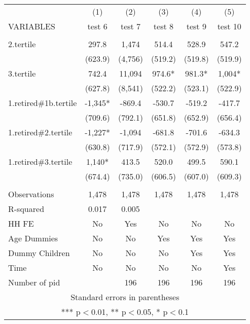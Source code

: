 \begin{tabular}{lccccc} \hline
 & (1) & (2) & (3) & (4) & (5) \\
VARIABLES & test 6 & test 7 & test 8 & test 9 & test 10 \\ \hline
 &  &  &  &  &  \\
2.tertile & 297.8 & 1,474 & 514.4 & 528.9 & 547.2 \\
 & (623.9) & (4,756) & (519.2) & (519.8) & (519.9) \\
3.tertile & 742.4 & 11,094 & 974.6* & 981.3* & 1,004* \\
 & (627.8) & (8,541) & (522.2) & (523.1) & (522.9) \\
1.retired\#1b.tertile & -1,345* & -869.4 & -530.7 & -519.2 & -417.7 \\
 & (709.6) & (792.1) & (651.8) & (652.9) & (656.4) \\
1.retired\#2.tertile & -1,227* & -1,094 & -681.8 & -701.6 & -634.3 \\
 & (630.8) & (717.9) & (572.1) & (572.9) & (573.8) \\
1.retired\#3.tertile & 1,140* & 413.5 & 520.0 & 499.5 & 590.1 \\
 & (674.4) & (735.0) & (606.5) & (607.0) & (609.3) \\
 &  &  &  &  &  \\
Observations & 1,478 & 1,478 & 1,478 & 1,478 & 1,478 \\
R-squared & 0.017 & 0.005 &  &  &  \\
HH FE & No & Yes & No & No & No \\
Age Dummies & No & No & Yes & Yes & Yes \\
Dummy Children & No & No & No & Yes & Yes \\
Time & No & No & No & No & Yes \\
 Number of pid &  & 196 & 196 & 196 & 196 \\ \hline
\multicolumn{6}{c}{ Standard errors in parentheses} \\
\multicolumn{6}{c}{ *** p$<$0.01, ** p$<$0.05, * p$<$0.1} \\
\end{tabular}
